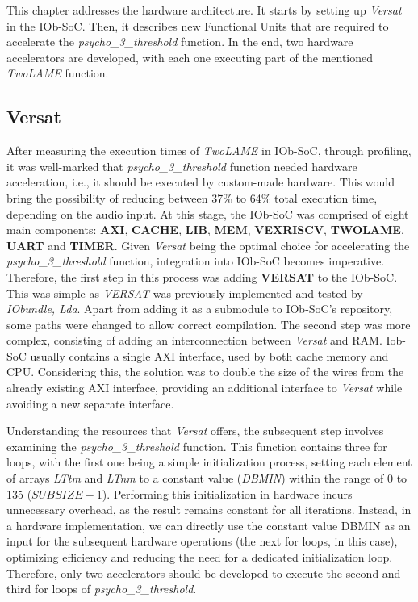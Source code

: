 
This chapter addresses the hardware architecture. It starts by setting up \textit{Versat} in the IOb-SoC. Then, it describes new Functional Units that are required to accelerate the \textit{psycho\_3\_threshold} function. In the end, two hardware accelerators are developed, with each one executing part of the mentioned \textit{TwoLAME} function.

\subsection{Versat}

After measuring the execution times of \textit{TwoLAME} in IOb-SoC, through profiling, it was well-marked that \textit{psycho\_3\_threshold} function needed hardware acceleration, i.e., it should be executed by custom-made hardware. This would bring the possibility of reducing between 37\% to 64\% total execution time, depending on the audio input.
At this stage, the IOb-SoC was comprised of eight main components: \textbf{AXI}, \textbf{CACHE}, \textbf{LIB}, \textbf{MEM}, \textbf{VEXRISCV}, \textbf{TWOLAME}, \textbf{UART} and \textbf{TIMER}. Given \textit{Versat} being the optimal choice for accelerating the \textit{psycho\_3\_threshold} function, integration into IOb-SoC becomes imperative.
Therefore, the first step in this process was adding \textbf{VERSAT} to the IOb-SoC. This was simple as \textit{VERSAT} was previously implemented and tested by \textit{IObundle, Lda}. Apart from adding it as a submodule to IOb-SoC's repository, some paths were changed to allow correct compilation.
The second step was more complex, consisting of adding an interconnection between \textit{Versat} and RAM. Iob-SoC usually contains a single AXI interface, used by both cache memory and CPU. Considering this, the solution was to double the size of the wires from the already existing AXI interface, providing an additional interface to \textit{Versat} while avoiding a new separate interface.

Understanding the resources that \textit{Versat} offers, the subsequent step involves examining the \textit{psycho\_3\_threshold} function.
This function contains three for loops, with the first one being a simple initialization process, setting each element of arrays \textit{LTtm} and \textit{LTnm} to a constant value (\textit{DBMIN}) within the range of 0 to 135 ($SUBSIZE-1$). Performing this initialization in hardware incurs unnecessary overhead, as the result remains constant for all iterations. Instead, in a hardware implementation, we can directly use the constant value DBMIN as an input for the subsequent hardware operations (the next for loops, in this case), optimizing efficiency and reducing the need for a dedicated initialization loop.
Therefore, only two accelerators should be developed to execute the second and third for loops of \textit{psycho\_3\_threshold}.

